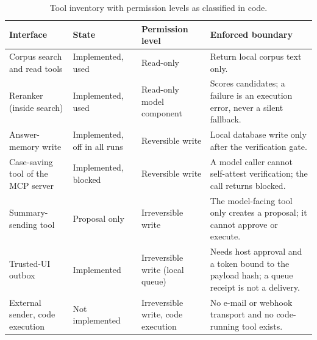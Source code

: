 \begin{table}[!htbp]\tabstyle
\begin{tabularx}{\textwidth}{@{}L{3.3cm}L{2.2cm}L{2.5cm}Y@{}}
\toprule Interface & State & Permission level & Enforced boundary\\\midrule
Corpus search and read tools & Implemented, used & Read-only & Return local corpus text only.\\
Reranker (inside search) & Implemented, used & Read-only model component & Scores candidates; a failure is an execution error, never a silent fallback.\\
Answer-memory write & Implemented, off in all runs & Reversible write & Local database write only after the verification gate.\\
Case-saving tool of the MCP server & Implemented, blocked & Reversible write & A model caller cannot self-attest verification; the call returns blocked.\\
Summary-sending tool & Proposal only & Irreversible write & The model-facing tool only creates a proposal; it cannot approve or execute.\\
Trusted-UI outbox & Implemented & Irreversible write (local queue) & Needs host approval and a token bound to the payload hash; a queue receipt is not a delivery.\\
External sender, code execution & Not implemented & Irreversible write, code execution & No e-mail or webhook transport and no code-running tool exists.\\
\bottomrule\end{tabularx}
\caption{Tool inventory with permission levels as classified in code.}\label{tab:tools}
\end{table}
